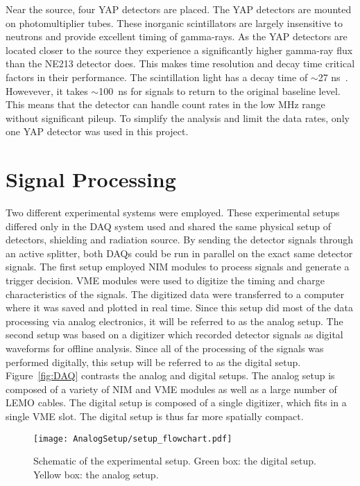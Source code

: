 \documentclass[main.tex]{subfiles}
\begin{document}
Near the source, four YAP detectors are placed. The YAP detectors are mounted on photomultiplier tubes. These inorganic scintillators are largely insensitive to neutrons and provide excellent timing of gamma-rays. As the YAP detectors are located closer to the source they experience a significantly higher gamma-ray flux than the NE213 detector does. This makes time resolution and decay time critical factors in their performance. The scintillation light has a decay time of $\sim$27 ns~\cite{Scionix}. Howevever, it takes $\sim$\SI{100}{ns} for signals to return to the original baseline level. This means that the detector can handle count rates in the low MHz range without significant pileup. To simplify the analysis and limit the data rates, only one YAP detector was used in this project.

\section{Signal Processing}
Two different experimental systems were employed. These experimental setups differed only in the DAQ system used and shared the same physical setup of detectors, shielding and radiation source. By sending the detector signals through an active splitter, both DAQs could be run in parallel on the exact same detector signals. The first setup employed NIM modules to process signals and generate a trigger decision. VME modules were used to digitize the timing and charge characteristics of the signals. The digitized data were transferred to a computer where it was saved and plotted in real time. Since this setup did most of the data processing via analog electronics, it will be referred to as the analog setup. The second setup was based on a digitizer which recorded detector signals as digital waveforms for offline analysis. Since all of the processing of the signals was performed digitally, this setup will be referred to as the digital setup. Figure~\ref{fig:DAQ} contrasts the analog and digital setups. The analog setup is composed of a variety of NIM and VME modules as well as a large number of LEMO cables. The digital setup is composed of a single digitizer, which fits in a single VME slot. The digital setup is thus far more spatially compact.

\begin{figure}[h]
    \centering
        \texttt{[image: AnalogSetup/setup\_flowchart.pdf]}
        \caption[Schematic of the experimental setup.]{Schematic of the experimental setup. Green box: the digital setup. Yellow box: the analog setup.}
    \label{fig:setup}
\end{figure}
\end{document}
